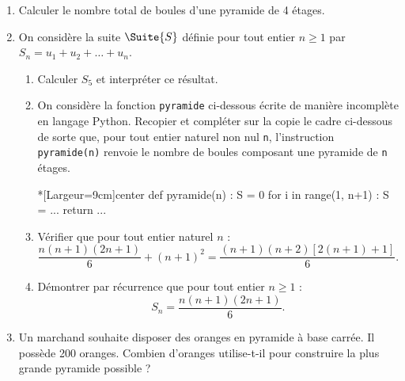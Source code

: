 \begin{enumerate}
	\item Calculer le nombre total de boules d’une pyramide de 4 étages.
	\item On considère la suite $\Suite{S}$ définie pour tout entier $n \geqslant 1$ par $S_n = u_1+u_2+\ldots+u_n$.
	\begin{enumerate}
		\item Calculer $S_5$ et interpréter ce résultat.
		\item On considère la fonction \texttt{pyramide} ci-dessous écrite de manière incomplète en langage \textsf{Python}. Recopier et compléter sur la copie le cadre ci-dessous de sorte que, pour tout entier naturel non nul \texttt{n}, l’instruction \texttt{pyramide(n)} renvoie le nombre de boules composant une pyramide de \texttt{n} étages.
		
\begin{CodePythonLstAlt}*[Largeur=9cm]{center}
def pyramide(n) :
	S = 0
	for i in range(1, n+1) :
		S = ...
	return ...
\end{CodePythonLstAlt}
		\item Vérifier que pour tout entier naturel $n$ : \[ \frac{n(n+1)(2n+1)}{6}+(n+1)^2 = \frac{(n+1)(n+2)[2(n+1)+1]}{6}. \]
		\item Démontrer par récurrence que pour tout entier $n \geqslant 1$ : \[ S_n = \frac{n(n+1)(2n+1)}{6}. \]
	\end{enumerate}
	\item Un marchand souhaite disposer des oranges en pyramide à base carrée. Il possède 200 oranges. Combien d’oranges utilise-t-il pour construire la plus grande pyramide possible ?
\end{enumerate}